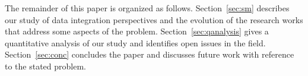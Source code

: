 The remainder of this paper is organized as follows. Section~\ref{sec:sm}
describes our study of data integration perspectives and the evolution of the
research works that address some aspects of the problem. Section~\ref{sec:qanalysis} gives a quantitative
analysis of our study and identifies open issues in the field.
Section~\ref{sec:conc} concludes the paper and discusses future work with
reference to the stated problem.


